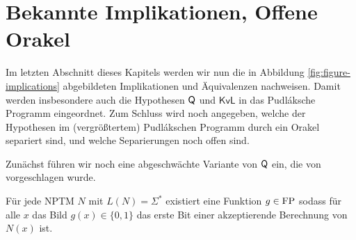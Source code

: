 

\section{Bekannte Implikationen, Offene Orakel}

Im letzten Abschnitt dieses Kapitels werden wir nun die in Abbildung \ref{fig:figure-implications} abgebildeten Implikationen und Äquivalenzen nachweisen.
Damit werden insbesondere auch die Hypothesen $\mathsf{Q}$ und $\mathsf{KvL}$ in das Pudláksche Programm eingeordnet.
Zum Schluss wird noch angegeben, welche der Hypothesen im (vergrößtertem) Pudlákschen Programm durch ein Orakel separiert sind, und welche Separierungen noch offen sind.

Zunächst führen wir noch eine abgeschwächte Variante von $\mathsf{Q}$ ein, die von \textcite{fenner_inverting_2003} vorgeschlagen wurde.

\begin{conjecture}
    Für jede NPTM $N$ mit $L(N)=\Sigma^*$ existiert eine Funktion $g\in\mathrm{FP}$ sodass für alle $x$ das Bild $g(x)\in\{0,1\}$ das erste Bit einer akzeptierende Berechnung von $N(x)$ ist. 
\end{conjecture}

